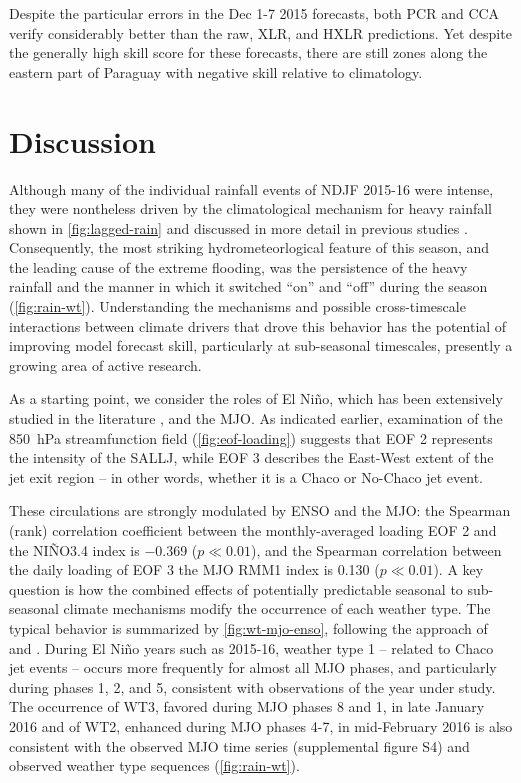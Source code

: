 \documentclass{ametsoc}
\begin{document}
Despite the particular errors in the Dec 1-7 2015 forecasts, both PCR and CCA verify considerably better than the raw, XLR, and HXLR predictions.
Yet despite the generally high skill score for these forecasts, there are still zones along the eastern part of Paraguay with negative skill relative to climatology.


\section{Discussion}
\label{sec:discussion}

Although many of the individual rainfall events of NDJF 2015-16 were intense, they were nontheless driven by the climatological mechanism for heavy rainfall shown in \cref{fig:lagged-rain} and discussed in more detail in previous studies \citep{Saulo:2007km,Salio:2007gd,Marengo2004,Velasco1987}.
Consequently, the most striking hydrometeorlogical feature of this season, and the leading cause of the extreme flooding, was the persistence of the heavy rainfall and the manner in which it switched ``on'' and ``off'' during the season (\cref{fig:rain-wt}).
Understanding the mechanisms and possible cross-timescale interactions between climate drivers that drove this behavior has the potential of improving model forecast skill, particularly at sub-seasonal timescales, presently a growing area of active research.

As a starting point, we consider the roles of El Ni\~{n}o, which has been extensively studied in the literature \citep{Carvalho2004,Velasco1987,Salio:2002ev,Bravo:2011et,Grimm2009}, and the MJO.
As indicated earlier, examination of the \SI{850}{\hecto\pascal} streamfunction field (\cref{fig:eof-loading}) suggests that EOF 2 represents the intensity of the SALLJ, while EOF 3 describes the East-West extent of the jet exit region -- in other words, whether it is a Chaco or No-Chaco jet event.

These circulations are strongly modulated by ENSO and the MJO: the Spearman (rank) correlation coefficient between the monthly-averaged loading EOF 2 and the NI\~NO3.4 index is \num{-.369} ($p \ll 0.01$), and the Spearman correlation between the daily loading of EOF 3 the MJO RMM1 index is \num{0.130} ($p \ll 0.01$).
A key question is how the combined effects of potentially predictable seasonal to sub-seasonal climate mechanisms modify the occurrence of each weather type.
The typical behavior is summarized by \cref{fig:wt-mjo-enso}, following the approach of \citet{Munoz2016} and \citet{Moron2015}.
During El Ni\~{n}o years such as 2015-16, weather type 1 -- related to Chaco jet events -- occurs more frequently for almost all MJO phases, and particularly during phases 1, 2, and 5, consistent with observations of the year under study.
The occurrence of WT3, favored during MJO phases 8 and 1, in late January 2016 and of WT2, enhanced during MJO phases 4-7, in mid-February 2016 is also consistent with the observed MJO time series (supplemental figure S4) and observed weather type sequences (\cref{fig:rain-wt}).
\end{document}
